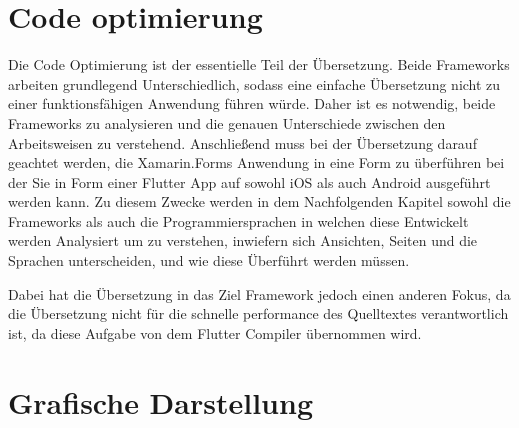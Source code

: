 \section{Code optimierung}
Die Code Optimierung ist der essentielle Teil der Übersetzung.  Beide Frameworks arbeiten grundlegend Unterschiedlich,  sodass eine einfache Übersetzung nicht zu einer funktionsfähigen Anwendung führen würde.  Daher ist es notwendig,  beide Frameworks zu analysieren und die genauen Unterschiede zwischen den Arbeitsweisen zu verstehend. Anschließend muss bei der Übersetzung darauf geachtet werden,  die Xamarin.Forms Anwendung in eine Form zu überführen bei der Sie in Form einer Flutter App auf sowohl iOS als auch Android ausgeführt werden kann.  Zu diesem Zwecke werden in dem Nachfolgenden Kapitel sowohl die Frameworks als auch die Programmiersprachen in welchen diese Entwickelt werden Analysiert um zu verstehen,  inwiefern sich Ansichten, Seiten und die Sprachen unterscheiden, und wie diese Überführt werden müssen. 

Dabei hat die Übersetzung in das Ziel Framework jedoch einen anderen Fokus,  da die Übersetzung nicht für die schnelle performance des Quelltextes verantwortlich ist, da diese Aufgabe von dem Flutter Compiler übernommen wird. 

\section{Grafische Darstellung}
